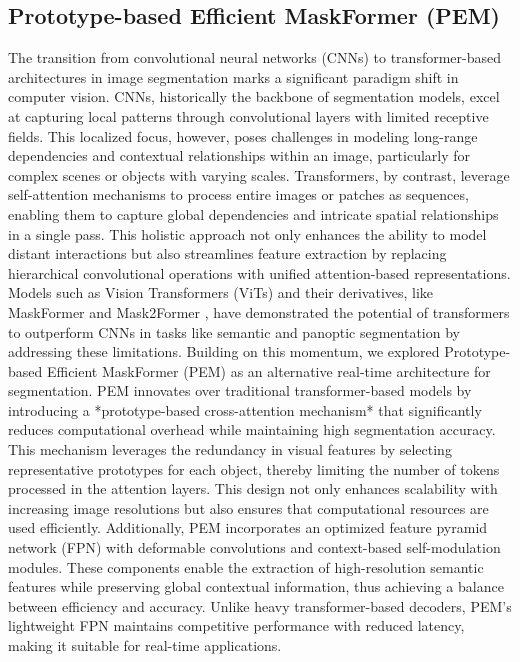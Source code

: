 \documentclass[10pt,twocolumn,letterpaper]{article}
\begin{document}
\subsection{Prototype-based Efficient MaskFormer (PEM)}
The transition from convolutional neural networks (CNNs) to transformer-based architectures in image segmentation marks a significant paradigm shift in computer vision. CNNs, historically the backbone of segmentation models, excel at capturing local patterns through convolutional layers with limited receptive fields. This localized focus, however, poses challenges in modeling long-range dependencies and contextual relationships within an image, particularly for complex scenes or objects with varying scales. Transformers, by contrast, leverage self-attention mechanisms to process entire images or patches as sequences, enabling them to capture global dependencies and intricate spatial relationships in a single pass. This holistic approach not only enhances the ability to model distant interactions but also streamlines feature extraction by replacing hierarchical convolutional operations with unified attention-based representations. Models such as Vision Transformers (ViTs) and their derivatives, like MaskFormer \cite{cheng2021maskformer} and Mask2Former \cite{cheng2021mask2former}, have demonstrated the potential of transformers to outperform CNNs in tasks like semantic and panoptic segmentation by addressing these limitations.
Building on this momentum, we explored Prototype-based Efficient MaskFormer (PEM) \cite{cavagnero2024pem} as an alternative real-time architecture for segmentation. 
PEM innovates over traditional transformer-based models by introducing a *prototype-based cross-attention mechanism* that significantly reduces computational overhead while maintaining high segmentation accuracy. This mechanism leverages the redundancy in visual features by selecting representative prototypes for each object, thereby limiting the number of tokens processed in the attention layers. This design not only enhances scalability with increasing image resolutions but also ensures that computational resources are used efficiently.
Additionally, PEM incorporates an optimized feature pyramid network (FPN) with deformable convolutions and context-based self-modulation modules. These components enable the extraction of high-resolution semantic features while preserving global contextual information, thus achieving a balance between efficiency and accuracy. Unlike heavy transformer-based decoders, PEM’s lightweight FPN maintains competitive performance with reduced latency, making it suitable for real-time applications. 
\end{document}
